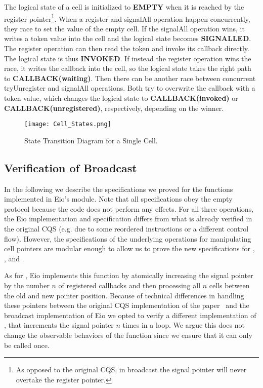 The logical state of a cell is initialized to \textbf{EMPTY} when it is reached by the register pointer\footnote{As opposed to the original CQS, in broadcast the signal pointer will never overtake the register pointer.}.
When a register and signalAll operation happen concurrently, they race to set the value of the empty cell.
If the signalAll operation wins, it writes a token value into the cell and the logical state becomes \textbf{SIGNALLED}.
The register operation can then read the token and invoke its callback directly.
The logical state is thus \textbf{INVOKED}.
If instead the register operation wins the race, it writes the callback into the cell, so the logical state takes the right path to \textbf{CALLBACK(waiting)}.
Then there can be another race between concurrent tryUnregister and signalAll operations.
Both try to overwrite the callback with a token value, which changes the logical state to \textbf{CALLBACK(invoked)} or \textbf{CALLBACK(unregistered)}, respectively, depending on the winner.

\begin{figure}[ht]
  \texttt{[image: Cell\_States.png]}
  \caption{State Transition Diagram for a Single Cell.}
  \label{fig:cqs-cell-states}
\end{figure}

\subsection{Verification of Broadcast}
\label{sec:broadcast-spec}

In the following we describe the specifications we proved for the functions implemented in Eio's  module.
Note that all specifications obey the empty protocol because the code does not perform any effects.
For all three operations, the Eio implementation and specification differs from what is already verified in the original CQS (e.g. due to some reordered instructions or a different control flow).
However, the specifications of the underlying operations for manipulating cell pointers are modular enough to allow us to prove the new specifications for , , and .

As for , Eio implements this function by atomically increasing the signal pointer by the number \(n\) of registered callbacks and then processing all \(n\) cells between the old and new pointer position.
Because of technical differences in handling these pointers between the original CQS implementation of the paper~\cite{koval2023cqs} and the broadcast implementation of Eio we opted to verify a different implementation of , that increments the signal pointer \(n\) times in a loop.
We argue this does not change the observable behaviors of the function since we ensure that it can only be called once.

